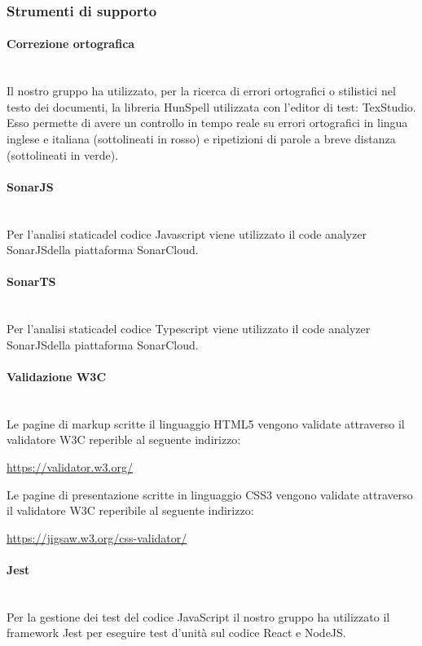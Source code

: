 \subsubsection{Strumenti di supporto}
	\paragraph{Correzione ortografica}\mbox{}\\ [1mm]
	Il nostro gruppo ha utilizzato, per la ricerca di errori ortografici o stilistici nel testo dei documenti, la libreria HunSpell utilizzata con l'editor di test: TexStudio. Esso permette di avere un controllo in tempo reale su errori ortografici in lingua inglese e italiana (sottolineati in rosso) e ripetizioni di parole a breve distanza (sottolineati in verde).
	\paragraph{SonarJS}\mbox{}\\ [1mm]
	Per l'analisi statica\glosp del codice Javascript viene utilizzato il code analyzer SonarJS\glosp della piattaforma SonarCloud.
	\paragraph{SonarTS}\mbox{}\\ [1mm]
	Per l'analisi statica\glosp del codice Typescript viene utilizzato il code analyzer SonarJS\glosp della piattaforma SonarCloud.
	\paragraph{Validazione W3C}\mbox{}\\ [1mm]
	Le pagine di markup scritte il linguaggio HTML5 vengono validate attraverso il validatore W3C reperible al seguente indirizzo: 
	\begin{center}
		\url{https://validator.w3.org/}
	\end{center}
	Le pagine di presentazione scritte in linguaggio CSS3 vengono validate attraverso il validatore W3C reperibile al seguente indirizzo:
	\begin{center}
		\url{https://jigsaw.w3.org/css-validator/}
	\end{center}
	\paragraph{Jest}\mbox{}\\ [1mm]
	Per la gestione dei test del codice JavaScript il nostro gruppo ha utilizzato il framework Jest per eseguire test d'unità sul codice React e NodeJS.
